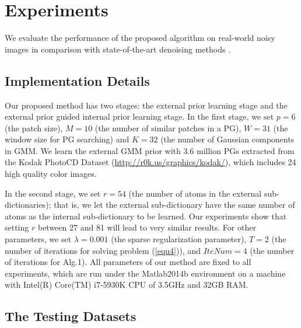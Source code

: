 \documentclass[10pt,twocolumn,letterpaper]{article}
\begin{document}

\section{Experiments}\vspace{-1mm}

We evaluate the performance of the proposed algorithm on real-world noisy images \cite{crosschannel2016,ncwebsite}  in comparison with  state-of-the-art denoising methods \cite{bm3d,cbm3d,mlp,wnnm,csf,chen2015learning,crosschannel2016,noiseclinic,ncwebsite,neatimage}.


\subsection{Implementation Details}\vspace{-1mm}

Our proposed method has two stages: the external prior learning stage and the external prior guided internal prior learning stage. In the first stage, we set $p = 6$ (the patch size), $M = 10$ (the number of similar patches in a PG), $W = 31$ (the window size for PG searching) and $K = 32$ (the number of Gaussian components in GMM. We learn the external GMM prior with 3.6 million PGs extracted from the Kodak PhotoCD Dataset (\url{http://r0k.us/graphics/kodak/}), which includes 24 high quality color images. 

In the second stage, we set $r = 54$ (the number of atoms in the external sub-dictionaries); that is, we let the external sub-dictionary have the same number of atoms as the internal sub-dictionary to be learned. Our experiments show that setting $r$ between 27 and 81 will lead to very similar results. For other parameters, we set $\lambda=0.001$ (the sparse regularization parameter), $T = 2$ (the number of iterations for solving problem (\ref{equ4})), and $IteNum = 4$ (the number of iterations for Alg.1). All parameters of our method are fixed to all experiments, which are run under the Matlab2014b environment on a machine with Intel(R) Core(TM) i7-5930K CPU of 3.5GHz and 32GB RAM.

\vspace{-1mm}
\subsection{The Testing Datasets}\vspace{-1mm}
\end{document}
